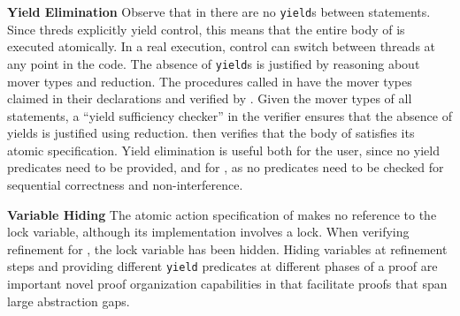 {\bf Yield Elimination} Observe that in 
 there are no {\tt yield}s between
statements. Since threds explicitly yield control, this means that the
entire body of  is executed atomically. In
a real execution, control can switch between threads at any point in
the code. The absence of {\tt yield}s is justified by reasoning about
mover types and reduction. The procedures called in
 have the mover types claimed in their
declarations and verified by \civl. Given the mover types of all
statements, a ``yield sufficiency
checker'' in the \civl verifier ensures
that the absence of yields is justified using reduction.  \civl
then verifies that the body of  satisfies
its atomic specification. Yield elimination is useful both for the
user, since no yield predicates need to be provided, and for \civl,
as no predicates need to be checked for sequential correctness and
non-interference.

{\bf Variable Hiding} The atomic action specification of 
makes no reference to the lock variable, although its implementation
involves a lock. When verifying refinement for , the lock
variable has been hidden. Hiding variables at refinement steps and
providing different {\tt yield} predicates at different phases of a
proof are important novel proof organization capabilities in \civl
that facilitate proofs that span large abstraction gaps.

